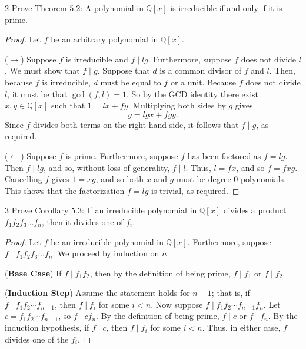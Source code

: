 \begin{problem}{2}
    Prove Theorem $5.2$: A polynomial in $\mathbb{Q}[x]$
    is irreducible if and only if it is prime.
\end{problem}
\solved

\begin{proof}
    Let $f$ be an arbitrary polynomial in $\mathbb{Q}[x]$.

    ($\rightarrow$) Suppose $f$ is irreducible and $f \mid l g$.
    Furthermore, suppose $f$ does not divide $l$.
    We must show that $f \mid g$.
    Suppose that $d$ is a common divisor of $f$ and $l$.
    Then, because $f$ is irreducible, $d$ must 
        be equal to $f$ or a unit.
    Because $f$ does not divide $l$, it must be that    
        $\gcd(f, l) = 1$.
    So by the GCD identity there exist $x, y \in \mathbb{Q}[x]$
        such that $1 = l x + f y$. 
    Multiplying both sides by $g$ gives
        \[ g = l g x + f g y. \]
    Since $f$ divides both terms on the right-hand side,
        it follows that $f \mid g$, as required.

    ($\leftarrow$) Suppose $f$ is prime.
    Furthermore, suppose $f$ has been factored as $f = l g$.
    Then $f \mid l g$, and so, without loss of generality,
        $f \mid l$.
    Thus, $l = f x$, and so $f = f x g$. 
    Cancelling $f$ gives $1 = x g$, and so both $x$ and $g$
        must be degree $0$ polynomials.
    This shows that the factorization $f = l g$
        is trivial, as required.
\end{proof}

\begin{problem}{3}
    Prove Corollary $5.3$: If an irreducible polynomial
    in $\mathbb{Q}[x]$ divides a product $f_1 f_2 f_3 \ldots f_n$,
    then it divides one of $f_i$.
\end{problem}
\solved

\begin{proof}
    Let $f$ be an irreducible polynomial in $\mathbb{Q}[x]$.
    Furthermore, suppose $f \mid f_1 f_2 f_3 \ldots f_n$.
    We proceed by induction on $n$.

    (\textbf{Base Case})  
    If $f \mid f_1 f_2$, then by the definition of being prime, 
    $f \mid f_1$ or $f \mid f_2$.

    (\textbf{Induction Step})  
    Assume the statement holds for $n - 1$; that is, 
    if $f \mid f_1 f_2 \cdots f_{n-1}$, then $f \mid f_i$ for some $i < n$.  
    Now suppose $f \mid f_1 f_2 \cdots f_{n-1} f_n$.  
    Let $c = f_1 f_2 \cdots f_{n-1}$, so $f \mid c f_n$.  
    By the definition of being prime, $f \mid c$ or $f \mid f_n$.  
    By the induction hypothesis, if $f \mid c$, then $f \mid f_i$ for some $i < n$.  
    Thus, in either case, $f$ divides one of the $f_i$.
\end{proof}

